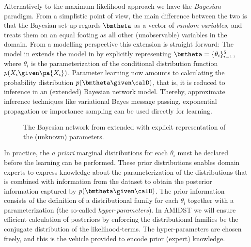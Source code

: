 Alternatively to the maximum likelihood approach we have the \textit{Bayesian}  paradigm. From a simplistic point of view, the main difference between the two is that the Bayesian set-up regards  $\bmtheta$ as a vector of \textit{random variables}, and treats them on an equal footing as all other (unobservable) variables in the domain. 
From a modelling perspective this extension is straight forward: The model in   extends the model in  by explicitly representing $\bmtheta=\{\theta_i\}_{i=1}^5$, where $\theta_i$ is the parameterization of the conditional distribution function $p(X_i\given\pa{X_i})$. 
Parameter learning now amounts to calculating the probability distribution $p(\bmtheta\given\calD)$, that is, it is  reduced to inference in an (extended) Bayesian network model. Thereby, approximate inference techniques like variational Bayes message passing, exponential propagation or importance sampling can be used directly for learning. 

\begin{figure}[htb]
  \begin{center}
  \end{center}
  \caption{The Bayesian network from  extended with explicit representation of the (unknown) parameters.}
  \label{fig:bayesLearn}
\end{figure}


In practice, the \textit{a priori} marginal distributions for each $\theta_i$ must be declared before the learning can be performed. These prior distributions enables domain experts to express knowledge about the parameterization of the distributions that is combined with information from the dataset to obtain the posterior information captured by $p(\bmtheta\given\calD)$. 
The prior information consists of the definition of a distributional family for each $\theta_i$ together with a parameterization (the so-called \textit{hyper-parameters}). In AMIDST we will ensure efficient calculation of posteriors by enforcing the distributional families be the conjugate distribution of the likelihood-terms.
The hyper-parameters are chosen freely, and this is the vehicle provided to encode prior (expert) knowledge. 






